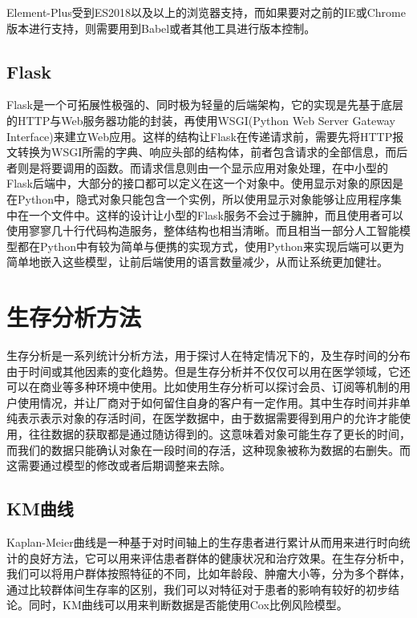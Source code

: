 Element-Plus受到ES2018以及以上的浏览器支持，而如果要对之前的IE或Chrome版本进行支持，则需要用到Babel或者其他工具进行版本控制。

\subsection{Flask}

Flask是一个可拓展性极强的、同时极为轻量的后端架构，它的实现是先基于底层的HTTP与Web服务器功能的封装，再使用WSGI(Python Web Server Gateway Interface)来建立Web应用。这样的结构让Flask在传递请求前，需要先将HTTP报文转换为WSGI所需的字典、响应头部的结构体，前者包含请求的全部信息，而后者则是将要调用的函数。而请求信息则由一个显示应用对象处理，在中小型的Flask后端中，大部分的接口都可以定义在这一个对象中。使用显示对象的原因是在Python中，隐式对象只能包含一个实例，所以使用显示对象能够让应用程序集中在一个文件中。这样的设计让小型的Flask服务不会过于臃肿，而且使用者可以使用寥寥几十行代码构造服务，整体结构也相当清晰。而且相当一部分人工智能模型都在Python中有较为简单与便携的实现方式，使用Python来实现后端可以更为简单地嵌入这些模型，让前后端使用的语言数量减少，从而让系统更加健壮。

\section{生存分析方法}

生存分析是一系列统计分析方法，用于探讨人在特定情况下的，及生存时间的分布由于时间或其他因素的变化趋势。但是生存分析并不仅仅可以用在医学领域，它还可以在商业等多种环境中使用。比如使用生存分析可以探讨会员、订阅等机制的用户使用情况，并让厂商对于如何留住自身的客户有一定作用。其中生存时间并非单纯表示表示对象的存活时间，在医学数据中，由于数据需要得到用户的允许才能使用，往往数据的获取都是通过随访得到的。这意味着对象可能生存了更长的时间，而我们的数据只能确认对象在一段时间的存活，这种现象被称为数据的右删失。而这需要通过模型的修改或者后期调整来去除。

\subsection{KM曲线}

Kaplan-Meier曲线是一种基于对时间轴上的生存患者进行累计从而用来进行时向统计的良好方法，它可以用来评估患者群体的健康状况和治疗效果。在生存分析中，我们可以将用户群体按照特征的不同，比如年龄段、肿瘤大小等，分为多个群体，通过比较群体间生存率的区别，我们可以对特征对于患者的影响有较好的初步结论。同时，KM曲线可以用来判断数据是否能使用Cox比例风险模型。

